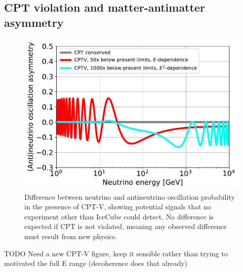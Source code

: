 \documentclass[a4paper,11pt]{article}
\begin{document}


\subsection{CPT violation and matter-antimatter asymmetry}

\begin{figure} %
    \centering
        \vspace{-9pt}
        \includegraphics[trim=0.0cm 0.0cm 0.cm 0.0cm, clip=true, width=1.\linewidth]{images/cptv_IceCube.pdf}
		\caption{Difference between neutrino and antineutrino oscillation probability in the presence of CPT-V, showing potential signals that no experiment other than IceCube could detect. No difference is expected if CPT is not violated, meaning any observed difference must result from new physics. }
		\vspace{-7pt}
		\label{fig:cptv}
\end{figure}

TODO Need a new CPT-V figure, keep it sensible rather than trying to motivated the full E range (decoherence does that already)
\end{document}

